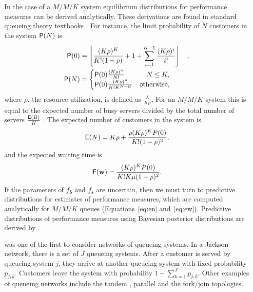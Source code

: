 \documentclass[article]{jss}
\begin{document}
In the case of a $M/M/K$ system equilibrium distributions for
performance measures can be derived analytically. These derivations are 
found in standard queueing theory textbooks \citep{lipsky2008queueing,
  thomopoulos2012fundamentals}. For instance, the limit probability of
$N$ customers in the system $\mathsf{P}(N)$ is
%
\begin{align}
\mathsf{P}(0) &= \left[\frac{ (K \rho)^K}{K! (1 - \rho)} + 1 + \sum_{i=1}^{K-1} \frac{(K \rho)^i}{i!}   \right]^{-1}, \nonumber \\
\mathsf{P}(N) &= \begin{cases} 
\mathsf{P}(0) \frac{(K \rho)^n }{N!} & \quad  N \leq K,\\
\mathsf{P}(0) \frac{(K \rho)^n }{K! K^{N-K}} & \text{otherwise} ,
\end{cases} \label{eq:pn}
\end{align}
%
where $\rho$, the resource utilization, is defined as
$\frac{\lambda}{K \mu}$. For an $M/M/K$ system this is equal to the
expected number of busy servers divided by the total number of servers
$\frac{\mathsf{E}(B)}{K}$ \citep[p.~451]{cassandras2009introduction}. The
expected number of customers in the system is
\citep{bhat2015introduction}
%
\begin{align}
\mathsf{E}(N) = K\rho + \frac{\rho (K\rho)^K P(0)}{K!(1-\rho)^2} \label{eq:en},
\end{align}
%
and the expected waiting time is
%
\begin{align}
\mathsf{E}(\mathbf{w}) = \frac{(K \rho)^K P(0)}{K! K \mu(1-\rho)^2} \label{eq:ew}.
\end{align}
%
If the parameters of $f_{\boldsymbol{\delta}}$ and $f_{\mathbf{s}}$ are uncertain,
then we must turn to predictive distributions for estimates of
performance measures, which are computed analytically for $M/M/K$
queues (Equations~\ref{eq:en} and~\ref{eq:ew}). Predictive
distributions of performance measures using Bayesian posterior
distributions are derived by \citet{armero1994bayesian,
  armero1999dealing}.

\citet{jackson_networks_1957} was one of the first to consider networks of queueing systems. In a Jackson network, there is a set of $J$ queueing systems. After a customer is served by queueing system $j$, they arrive at another queueing system with fixed probability $p_{j,k}$. Customers leave the system with probability $1 - \sum_{k=1}^{J} p_{j,k}$. Other examples of queueing networks include the tandem \citep{glynn_departures_1991}, parallel \citep{hunt_fast_1995} and the fork/join \citep{kim_analysis_1989} topologies. 
\end{document}
